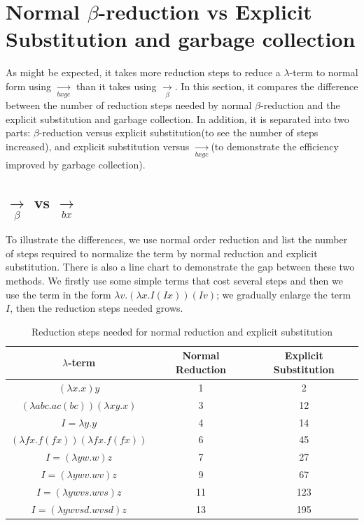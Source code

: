 \section{Normal $\beta$-reduction vs Explicit Substitution and garbage collection}

As might be expected, it takes more reduction steps to reduce a $\lambda$-term to normal form using $\xrightarrow[bxgc]{}$ than it takes using $\xrightarrow[\beta]{}$. In this section, it compares the difference between the number of reduction steps needed by normal $\beta$-reduction and the explicit substitution and garbage collection. In addition, it is separated into two parts: $\beta$-reduction versus explicit substitution(to see the number of steps increased), and explicit substitution versus $\xrightarrow[bxgc]{}$(to demonstrate the efficiency improved by garbage collection).


\subsection{$\xrightarrow[\beta ]{}$ vs $\xrightarrow[bx]{}$}

To illustrate the differences, we use normal order reduction and list the number of steps required to normalize the term by normal reduction and explicit substitution. There is also a line chart to demonstrate the gap between these two methods. We firstly use some simple terms that cost several steps and then we use the term in the form $\lambda v.(\lambda x.I(Ix))(Iv)$; we gradually enlarge the term $I$, then the reduction steps needed grows.

\begin{table}[h!]
\centering
\begin{tabular}{|c|c|c|}\hline
$\lambda$-term & Normal Reduction & Explicit Substitution\\ \hline
$(\lambda x.x)y$ & 1 & 2\\ \hline
$(\lambda abc.ac(bc))(\lambda xy.x)$ & 3 & 12\\ \hline
$I = \lambda y.y$ & 4 & 14\\ \hline
$(\lambda fx.f(fx))(\lambda fx.f(fx))$ & 6 & 45\\ \hline
$I = (\lambda yw.w)z$ & 7 & 27\\ \hline
$I = (\lambda ywv.wv)z$ & 9 & 67\\ \hline
$I = (\lambda ywvs.wvs)z$ & 11 & 123\\ \hline
$I = (\lambda ywvsd.wvsd)z$ & 13 & 195\\ \hline
\end{tabular}
\caption{Reduction steps needed for normal reduction and explicit substitution}
\label{tb:diff}
\end{table}

